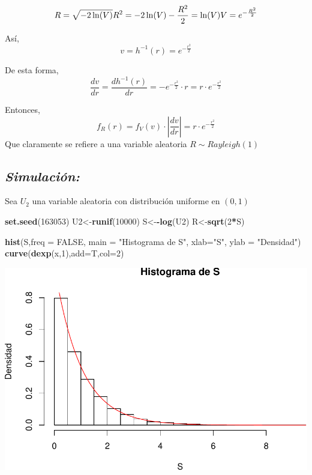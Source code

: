\documentclass[]{article}
\newenvironment{Shaded}{\begin{snugshade}}{\end{snugshade}}
\newcommand{\KeywordTok}[1]{\textcolor[rgb]{0.13,0.29,0.53}{\textbf{#1}}}
\newcommand{\DataTypeTok}[1]{\textcolor[rgb]{0.13,0.29,0.53}{#1}}
\newcommand{\DecValTok}[1]{\textcolor[rgb]{0.00,0.00,0.81}{#1}}
\newcommand{\StringTok}[1]{\textcolor[rgb]{0.31,0.60,0.02}{#1}}
\newcommand{\OtherTok}[1]{\textcolor[rgb]{0.56,0.35,0.01}{#1}}
\newcommand{\OperatorTok}[1]{\textcolor[rgb]{0.81,0.36,0.00}{\textbf{#1}}}
\newcommand{\NormalTok}[1]{#1}
\begin{document}
\begin{equation}
R = \sqrt{-2\ln(V)}\\
R^2 = -2\ln(V)\\
-\frac{R^2}{2}=\ln(V)\\
V=e^{-\frac{R^2}{2}}
\end{equation}

Así, \[v=h^{-1}(r)=e^{-\frac{r^2}{2}}\]

De esta forma, \[
\frac{dv}{dr}=\frac{dh^{-1}(r)}{dr}=-e^{-\frac{r^2}{2}} \cdot r=r \cdot e^{-\frac{r^2}{2}}
\]

Entonces, \[
f_R(r)=f_V(v)\cdot \left| \frac{dv}{dr}  \right|=r \cdot e^{-\frac{r^2}{2}}
\] Que claramente se refiere a una variable aleatoria
\(R\sim Rayleigh(1)\)

\newpage

\subsection{\texorpdfstring{\emph{Simulación:}}{Simulación:}}\label{simulacion-2}

Sea \(U_2\) una variable aleatoria con distribución uniforme en
\((0,1)\)

\begin{Shaded}
\begin{Highlighting}[]
\KeywordTok{set.seed}\NormalTok{(}\DecValTok{163053}\NormalTok{)}
\NormalTok{U2<-}\KeywordTok{runif}\NormalTok{(}\DecValTok{10000}\NormalTok{)}
\NormalTok{S<-}\OperatorTok{-}\KeywordTok{log}\NormalTok{(U2)}
\NormalTok{R<-}\KeywordTok{sqrt}\NormalTok{(}\DecValTok{2}\OperatorTok{*}\NormalTok{S)}

\KeywordTok{hist}\NormalTok{(S,}\DataTypeTok{freq =} \OtherTok{FALSE}\NormalTok{, }\DataTypeTok{main =} \StringTok{"Histograma de S"}\NormalTok{, }\DataTypeTok{xlab=}\StringTok{"S"}\NormalTok{, }\DataTypeTok{ylab =} \StringTok{"Densidad"}\NormalTok{)}
\KeywordTok{curve}\NormalTok{(}\KeywordTok{dexp}\NormalTok{(x,}\DecValTok{1}\NormalTok{),}\DataTypeTok{add=}\NormalTok{T,}\DataTypeTok{col=}\DecValTok{2}\NormalTok{)}
\end{Highlighting}
\end{Shaded}

\includegraphics[width=0.63\linewidth]{notebook_simulaciones_files/figure-latex/unnamed-chunk-10-1}
\end{document}
